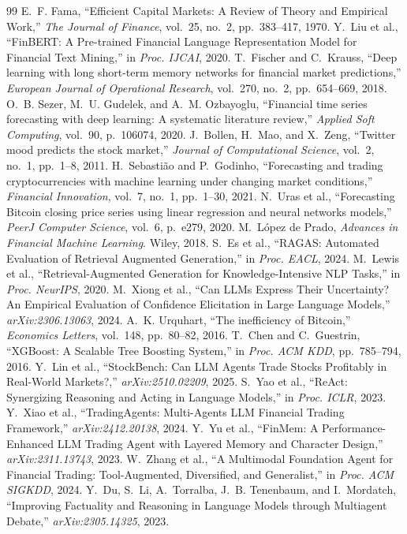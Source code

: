 \documentclass[10pt,twocolumn,a4paper]{article}
\begin{document}
\begin{thebibliography}{99}
\small
{} E.~F. Fama, ``Efficient Capital Markets: A Review of Theory and Empirical Work,'' \textit{The Journal of Finance}, vol.~25, no.~2, pp.~383--417, 1970.
 Y.~Liu et al., ``FinBERT: A Pre-trained Financial Language Representation Model for Financial Text Mining,'' in \textit{Proc. IJCAI}, 2020.
 T.~Fischer and C.~Krauss, ``Deep learning with long short-term memory networks for financial market predictions,'' \textit{European Journal of Operational Research}, vol.~270, no.~2, pp.~654--669, 2018.
 O.~B. Sezer, M.~U. Gudelek, and A.~M. Ozbayoglu, ``Financial time series forecasting with deep learning: A systematic literature review,'' \textit{Applied Soft Computing}, vol.~90, p.~106074, 2020.
 J.~Bollen, H.~Mao, and X.~Zeng, ``Twitter mood predicts the stock market,'' \textit{Journal of Computational Science}, vol.~2, no.~1, pp.~1--8, 2011.
 H.~Sebastião and P.~Godinho, ``Forecasting and trading cryptocurrencies with machine learning under changing market conditions,'' \textit{Financial Innovation}, vol.~7, no.~1, pp.~1--30, 2021.
 N.~Uras et al., ``Forecasting Bitcoin closing price series using linear regression and neural networks models,'' \textit{PeerJ Computer Science}, vol.~6, p.~e279, 2020.
 M.~López de Prado, \textit{Advances in Financial Machine Learning}. Wiley, 2018.
 S.~Es et al., ``RAGAS: Automated Evaluation of Retrieval Augmented Generation,'' in \textit{Proc. EACL}, 2024.
 M.~Lewis et al., ``Retrieval-Augmented Generation for Knowledge-Intensive NLP Tasks,'' in \textit{Proc. NeurIPS}, 2020.
 M.~Xiong et al., ``Can LLMs Express Their Uncertainty? An Empirical Evaluation of Confidence Elicitation in Large Language Models,'' \textit{arXiv:2306.13063}, 2024.
 A.~K. Urquhart, ``The inefficiency of Bitcoin,'' \textit{Economics Letters}, vol.~148, pp.~80--82, 2016.
 T.~Chen and C.~Guestrin, ``XGBoost: A Scalable Tree Boosting System,'' in \textit{Proc. ACM KDD}, pp.~785--794, 2016.
 Y.~Lin et al., ``StockBench: Can LLM Agents Trade Stocks Profitably in Real-World Markets?,'' \textit{arXiv:2510.02209}, 2025.
 S.~Yao et al., ``ReAct: Synergizing Reasoning and Acting in Language Models,'' in \textit{Proc. ICLR}, 2023.
 Y.~Xiao et al., ``TradingAgents: Multi-Agents LLM Financial Trading Framework,'' \textit{arXiv:2412.20138}, 2024.
 Y.~Yu et al., ``FinMem: A Performance-Enhanced LLM Trading Agent with Layered Memory and Character Design,'' \textit{arXiv:2311.13743}, 2023.
 W.~Zhang et al., ``A Multimodal Foundation Agent for Financial Trading: Tool-Augmented, Diversified, and Generalist,'' in \textit{Proc. ACM SIGKDD}, 2024.
 Y.~Du, S.~Li, A.~Torralba, J.~B. Tenenbaum, and I.~Mordatch, ``Improving Factuality and Reasoning in Language Models through Multiagent Debate,'' \textit{arXiv:2305.14325}, 2023.
\end{thebibliography}
\end{document}

